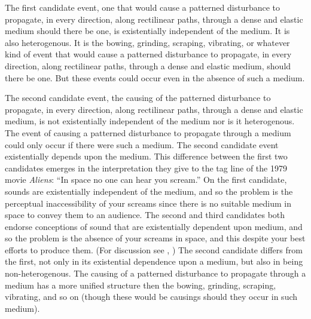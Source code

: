 \documentclass[12pt]{article}
\begin{document}
The first candidate event, one that would cause a patterned disturbance to propagate, in every direction, along rectilinear paths, through a dense and elastic medium should there be one, is existentially independent of the medium. It is also heterogenous. It is the bowing, grinding, scraping, vibrating, or whatever kind of event that would cause a patterned disturbance to propagate, in every direction, along rectilinear paths, through a dense and elastic medium, should there be one. But these events could occur even in the absence of such a medium.

The second candidate event, the causing of the patterned disturbance to propagate, in every direction, along rectilinear paths, through a dense and elastic medium, is not existentially independent of the medium nor is it heterogenous. The event of causing a patterned disturbance to propagate through a medium could only occur if there were such a medium. The second candidate event existentially depends upon the medium. This difference between the first two candidates emerges in the interpretation they give to the tag line of the 1979 movie \emph{Aliens}: ``In space no one can hear you scream.'' On the first candidate, sounds are existentially independent of the medium, and so the problem is the perceptual inaccessibility of your screams since there is no suitable medium in space to convey them to an audience. The second and third candidates both endorse conceptions of sound that are existentially dependent upon medium, and so the problem is the absence of your screams in space, and this despite your best efforts to produce them. (For discussion see \citealt{Pasnau:1999ss}, \citealt{OCallaghan:2007xy,OCallaghan:2009aa}) The second candidate differs from the first, not only in its existential dependence upon a medium, but also in being non-heterogenous. The causing of a patterned disturbance to propagate through a medium has a more unified structure then the bowing, grinding, scraping, vibrating, and so on (though these would be causings should they occur in such medium).
\end{document}
